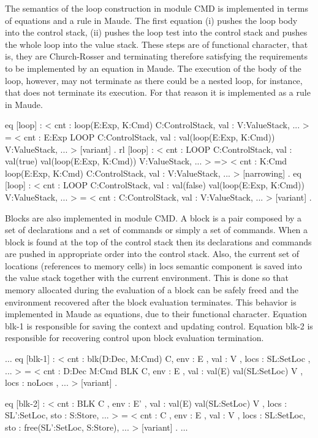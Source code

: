 \documentclass[a4paper,openany]{book}
\begin{document}
The semantics of the loop construction in module CMD is implemented in terms of equations and a rule in Maude. 
The first equation (i) pushes the loop body into the control stack, (ii) pushes the loop test into the control stack and pushes the whole loop into the value stack. These steps are of functional character, that is, they are Church-Rosser and terminating therefore satisfying the requirements to be implemented by an equation in Maude. The execution of the body of the loop, however, may not terminate as there could be a nested loop, for instance, that does not terminate its execution. For that reason it is implemented as a rule in Maude. 
\begin{maude}
eq [loop] : 
       < cnt : loop(E:Exp, K:Cmd) C:ControlStack, val : V:ValueStack, ... >  = 
       < cnt : E:Exp LOOP C:ControlStack, val : val(loop(E:Exp, K:Cmd)) V:ValueStack, ... > 
[variant] .
rl [loop] :  
      < cnt : LOOP C:ControlStack, val : val(true) val(loop(E:Exp, K:Cmd)) V:ValueStack, ... >  =>  
      < cnt : K:Cmd loop(E:Exp, K:Cmd) C:ControlStack, val : V:ValueStack, ... >  [narrowing] .
eq [loop] : 
      < cnt : LOOP C:ControlStack, val : val(false) val(loop(E:Exp, K:Cmd))  V:ValueStack, ... >  =  
      < cnt : C:ControlStack, val : V:ValueStack, ... > [variant] .
\end{maude}

Blocks are also implemented in module CMD. A block is a pair composed by a set of declarations and a set of commands or simply a set of commands. When a block is found at the top of the control stack then its declarations and commands are pushed in appropriate order into the control stack. Also, the current set of locations (references to memory cells) in locs semantic component is saved into the value stack together with the current environment. This is done so that memory allocated during the evaluation of a block can be safely freed and the environment recovered after the block evaluation terminates. This behavior is implemented in Maude as equations, due to their functional character.  Equation blk-1 is responsible for saving the context and updating control. Equation blk-2 is responsible for recovering control upon block evaluation termination.
\begin{maude}[caption=$\uppi$-automaton rules for block, label=lst:gia-block-maude]
    $\ldots$
    eq [blk-1] :
        < cnt : blk(D:Dec, M:Cmd) C, env : E , val : V , locs : SL:Set{Loc} , ... > 
     =
        < cnt : D:Dec M:Cmd BLK C, env : E , 
          val : val(E) val(SL:Set{Loc}) V , 
          locs : noLocs , ... > [variant] .

    eq [blk-2] :
       < cnt : BLK C ,
         env : E' ,
         val : val(E) val(SL:Set{Loc}) V ,
         locs : SL':Set{Loc},
         sto : S:Store, ... > 
     =
       < cnt : C ,
         env : E ,
         val : V ,
         locs : SL:Set{Loc},
         sto : free(SL':Set{Loc}, S:Store), ... > [variant] .
    $\ldots$       
\end{maude}
\end{document}
